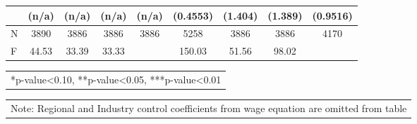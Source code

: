 \documentclass[12pt]{report}
\begin{document}
\begin{sidewaystable}
\begin{tabular}{lc|c|c|c|c|c|c|c}
& (n/a) & (n/a) & (n/a) & (n/a) & (0.4553) & (1.404) & (1.389) & (0.9516)\\
\hline
N & 3890 & 3886 & 3886 & 3886 & 5258 & 3886 & 3886 & 4170\\
F & 44.53 & 33.39 & 33.33 & & 150.03 & 51.56 & 98.02 & \\
\hline
\hline
\end{tabular}
\begin{tabular}{p{6.25in}}\footnotesize{
*p-value<0.10, **p-value<0.05, ***p-value<0.01}\\
\end{tabular}
\begin{tabular}{p{6.25in}}\footnotesize{
Note: Regional and Industry control coefficients from wage equation are omitted from table}\\
\end{tabular}
\end{sidewaystable}

\begin{comment}R-sq & 0.2925 & -0.3096 & -0.5036 & 0.2805 & 0.3138 & -0.6401 & -1.5136 & -0.3642\\
\end{comment}

\newpage
\end{document}
